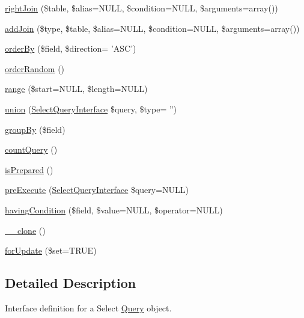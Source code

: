 \begin{DoxyCompactItemize}
\item 
\hyperlink{interfaceSelectQueryInterface_a563903061a31b87f34189a56d6f8a591}{rightJoin} (\$table, \$alias=NULL, \$condition=NULL, \$arguments=array())
\item 
\hyperlink{interfaceSelectQueryInterface_a974ba99af27e9b77d7f5fc69ec81bd45}{addJoin} (\$type, \$table, \$alias=NULL, \$condition=NULL, \$arguments=array())
\item 
\hyperlink{interfaceSelectQueryInterface_a80eca1c7bc37fca0468b6526a3f303e7}{orderBy} (\$field, \$direction= 'ASC')
\item 
\hyperlink{interfaceSelectQueryInterface_a647a3152b4cee89205bb9d7274ffd019}{orderRandom} ()
\item 
\hyperlink{interfaceSelectQueryInterface_a028f87f97fb72e0e43050740fd323181}{range} (\$start=NULL, \$length=NULL)
\item 
\hyperlink{interfaceSelectQueryInterface_a956f43a8444243b0233c7e182e4a424b}{union} (\hyperlink{interfaceSelectQueryInterface}{SelectQueryInterface} \$query, \$type= '')
\item 
\hyperlink{interfaceSelectQueryInterface_a6074bd3c289da304962ae5250d0b20f9}{groupBy} (\$field)
\item 
\hyperlink{interfaceSelectQueryInterface_a48fd44b77e75771af6d3f289502f050e}{countQuery} ()
\item 
\hyperlink{interfaceSelectQueryInterface_a04f6707fd382218aef1443a9facbc9f2}{isPrepared} ()
\item 
\hyperlink{interfaceSelectQueryInterface_a6e495fdb26a9b6a8752f381552140fa7}{preExecute} (\hyperlink{interfaceSelectQueryInterface}{SelectQueryInterface} \$query=NULL)
\item 
\hyperlink{interfaceSelectQueryInterface_a5b33d0a9d60cb31a705d590ae1cf8bef}{havingCondition} (\$field, \$value=NULL, \$operator=NULL)
\item 
\hyperlink{interfaceSelectQueryInterface_a5ed9c2932a32b2649a252e5594e1df83}{\_\-\_\-clone} ()
\item 
\hyperlink{interfaceSelectQueryInterface_a723663b3105f06f28c75bd9d16b7a3c7}{forUpdate} (\$set=TRUE)
\end{DoxyCompactItemize}


\subsection{Detailed Description}
Interface definition for a Select \hyperlink{classQuery}{Query} object. 

